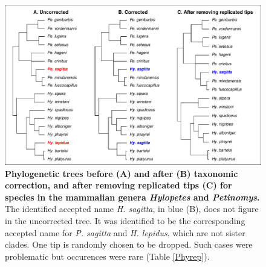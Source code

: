 \documentclass[11pt]{article}
\begin{document}
\begin{figure}[h!]
\centering
\includegraphics[scale=0.8]{figures/Case_studies/Case3}
\caption[Phylogenetic trees before (A) and after (B) taxonomic correction, and after removing replicated tips (C) for species in the mammalian genera \textit{Hylopetes} and \textit{Petinomys}]{\textbf{Phylogenetic trees before (A) and after (B) taxonomic correction, and after removing replicated tips (C) for species in the mammalian genera \textit{Hylopetes} and \textit{Petinomys}.} The identified accepted name \textit{H. sagitta}, in blue (B), does not figure in the uncorrected tree. It was identified to be the corresponding accepted name for \textit{P. sagitta} and \textit{H. lepidus}, which are not sister clades. One tip is randomly chosen to be dropped. Such cases were problematic but occurences were rare (Table \ref{Phyrep}).}
\label{case3}
\end{figure}


\pagebreak
\end{document}
